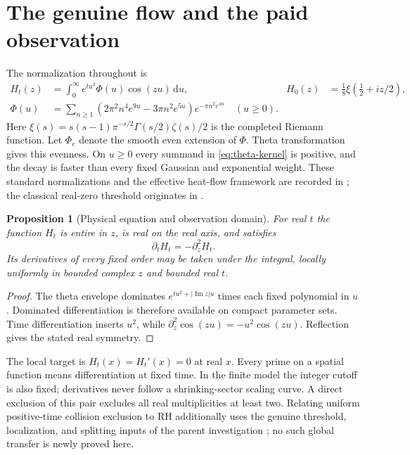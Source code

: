 \documentclass[11pt]{article}
\newtheorem{proposition}[theorem]{Proposition}
\theoremstyle{definition}
\theoremstyle{remark}
\newcommand{\dd}{\,\mathrm d}
\newcommand{\Ima}{\operatorname{Im}}
\begin{document}
\section{The genuine flow and the paid observation}
\label{sec:flow}

The normalization throughout is
\begin{align}
 H_t(z)&=\int_0^\infty e^{tu^2}\Phi(u)\cos(zu)\dd u,
 &H_0(z)&=\tfrac18\xi(\tfrac12+iz/2),\label{eq:heat}\\
 \Phi(u)&=\sum_{n\ge1}
 (2\pi^2n^4e^{9u}-3\pi n^2e^{5u})e^{-\pi n^2e^{4u}}
 \quad(u\ge0).\label{eq:theta-kernel}
\end{align}
Here $\xi(s)=s(s-1)\pi^{-s/2}\Gamma(s/2)\zeta(s)/2$ is the completed
Riemann function. Let $\Phi_e$ denote the smooth even extension of
$\Phi$. Theta transformation gives this evenness. On $u\ge0$ every
summand in \eqref{eq:theta-kernel} is positive, and the decay is faster
than every fixed Gaussian and exponential weight. These standard
normalizations and the effective heat-flow framework are recorded in
\cite{polymath}; the classical real-zero threshold originates in
\cite{debruijn,newman}.

\begin{proposition}[Physical equation and observation domain]
\label{prop:physical}
For real $t$ the function $H_t$ is entire in $z$, is real on the real
axis, and satisfies
\begin{equation}
 \partial_tH_t=-\partial_z^2H_t.
 \label{eq:newman-sign}
\end{equation}
Its derivatives of every fixed order may be taken under the integral,
locally uniformly in bounded complex $z$ and bounded real $t$.
\end{proposition}
\begin{proof}
The theta envelope dominates $e^{tu^2+|\Ima z|u}$ times each fixed
polynomial in $u$. Dominated differentiation is therefore available on
compact parameter sets. Time differentiation inserts $u^2$, while
$\partial_z^2\cos(zu)=-u^2\cos(zu)$. Reflection gives the stated real
symmetry.
\end{proof}

The local target is $H_t(x)=H_t'(x)=0$ at real $x$. Every prime on a
spatial function means differentiation at fixed time. In the finite
model the integer cutoff is also fixed; derivatives never follow a
shrinking-sector scaling curve. A direct exclusion of this pair excludes
all real multiplicities at least two. Relating uniform positive-time
collision exclusion to RH additionally uses the genuine threshold,
localization, and splitting inputs of the parent investigation
\cite{heatnotes}; no such global transfer is newly proved here.
\end{document}
